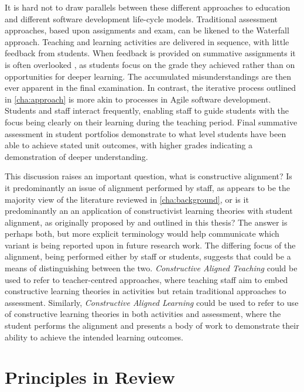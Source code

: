 It is hard not to draw parallels between these different approaches to education and different software development life-cycle models. Traditional assessment approaches, based upon assignments and exam, can be likened to the Waterfall approach. Teaching and learning activities are delivered in sequence, with little feedback from students. When feedback is provided on summative assignments it is often overlooked \cite{Black:1998}, as students focus on the grade they achieved rather than on opportunities for deeper learning. The accumulated misunderstandings are then ever apparent in the final examination. In contrast, the iterative process outlined in \cref{cha:approach} is more akin to processes in Agile software development. Students and staff interact frequently, enabling staff to guide students with the focus being clearly on their learning during the teaching period. Final summative assessment in student portfolios demonstrate to what level students have been able to achieve stated unit outcomes, with higher grades indicating a demonstration of deeper understanding.

This discussion raises an important question, what is constructive alignment? Is it predominantly an issue of alignment performed by staff, as appears to be the majority view of the literature reviewed in \cref{cha:background}, or is it predominantly an an application of constructivist learning theories with student alignment, as originally proposed by \citet{Biggs:1996c} and outlined in this thesis? The answer is perhaps both, but more explicit terminology would help communicate which variant is being reported upon in future research work. The differing focus of the alignment, being performed either by staff or students, suggests that could be a means of distinguishing between the two. \emph{Constructive Aligned Teaching} could be used to refer to teacher-centred approaches, where teaching staff aim to embed constructive learning theories in activities but retain traditional approaches to assessment. Similarly, \emph{Constructive Aligned Learning} could be used to refer to use of constructive learning theories in both activities and assessment, where the student performs the alignment and presents a body of work to demonstrate their ability to achieve the intended learning outcomes. 


\section{Principles in Review} %
\label{sec:principles_in_review}


